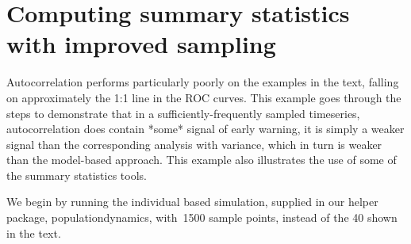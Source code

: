\documentclass{elsarticle}
\begin{document}
%
%

\section{Computing summary statistics with improved sampling}

Autocorrelation performs particularly poorly on the examples in the text, falling on approximately the 1:1 line in the ROC curves.  This example goes through the steps to demonstrate that in a sufficiently-frequently sampled timeseries, autocorrelation does contain *some* signal of early warning, it is simply a weaker signal than the corresponding analysis with variance, which in turn is weaker than the model-based approach. This example also illustrates the use of some of the summary statistics tools.   


We begin by running the individual based simulation, supplied in our helper package, populationdynamics, with~1500 sample points, instead of the 40 shown in the text.   
\end{document}
